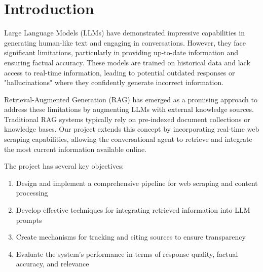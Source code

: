 \documentclass[fleqn,moreauthors,10pt]{ds_report}
\affiliation{\textit{Advisors: Aleš Žagar}}
\begin{document}
  
  
\flushbottom   
  
\maketitle   
  
\thispagestyle{empty}   
  
  
\section*{Introduction}  
Large Language Models (LLMs) have demonstrated impressive capabilities in generating human-like text and engaging in conversations. However, they face significant limitations, particularly in providing up-to-date information and ensuring factual accuracy. These models are trained on historical data and lack access to real-time information, leading to potential outdated responses or "hallucinations" where they confidently generate incorrect information.  
  
Retrieval-Augmented Generation (RAG) has emerged as a promising approach to address these limitations by augmenting LLMs with external knowledge sources. Traditional RAG systems typically rely on pre-indexed document collections or knowledge bases. Our project extends this concept by incorporating real-time web scraping capabilities, allowing the conversational agent to retrieve and integrate the most current information available online.  
  
The project has several key objectives:  
\begin{enumerate}[noitemsep]  
	\item Design and implement a comprehensive pipeline for web scraping and content processing  
	\item Develop effective techniques for integrating retrieved information into LLM prompts  
	\item Create mechanisms for tracking and citing sources to ensure transparency  
	\item Evaluate the system's performance in terms of response quality, factual accuracy, and relevance  
\end{enumerate}  
  
\end{document}
